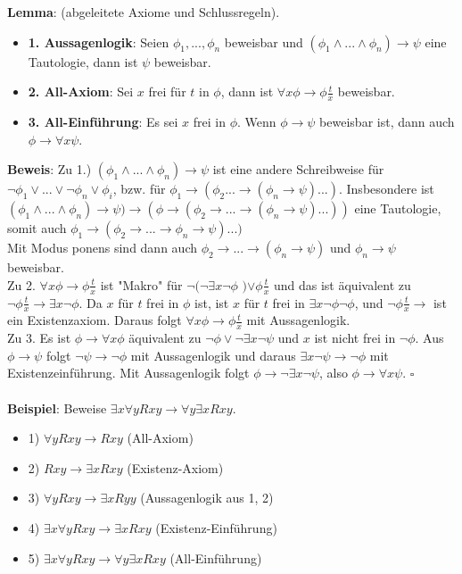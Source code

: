\documentclass[a4paper]{scrartcl}
\begin{document}
\textbf{Lemma}: (abgeleitete Axiome und Schlussregeln).
\begin{itemize}
\item \textbf{1. Aussagenlogik}: Seien $\phi_1, ..., \phi_n$ beweisbar und $(\phi_1 \wedge ... \wedge \phi_n) \rightarrow \psi$ eine Tautologie, dann ist $\psi$ beweisbar.
\item \textbf{2. All-Axiom}: Sei $x$ frei für $t$ in $\phi$, dann ist $\forall x \phi \rightarrow \phi \frac{t}{x}$ beweisbar.
\item \textbf{3. All-Einführung}: Es sei $x$ frei in $\phi$. Wenn $\phi \rightarrow \psi$ beweisbar ist, dann auch $\phi \rightarrow \forall x \psi$.
\end{itemize}
\textbf{Beweis}: Zu 1.) $(\phi_1 \wedge ... \wedge \phi_n) \rightarrow \psi$ ist eine andere Schreibweise für $\neg \phi_1 \vee ... \vee \neg \phi_n \vee \phi_i$, bzw. für $\phi_1 \rightarrow (\phi_2 ... \rightarrow (\phi_n \rightarrow \psi) ... )$. Insbesondere ist $(\phi_1 \wedge ... \wedge \phi_n) \rightarrow \psi) \rightarrow (\phi \rightarrow (\phi_2 \rightarrow ... \rightarrow (\phi_n \rightarrow \psi) ... ))$ eine Tautologie, somit auch $\phi_1 \rightarrow (\phi_2 \rightarrow ... \rightarrow \phi_n \rightarrow \psi) ... )$\\
Mit Modus ponens sind dann auch $\phi_2 \rightarrow ... \rightarrow (\phi_n \rightarrow \psi)$ und $\phi_n \rightarrow \psi$ beweisbar.\\
Zu 2. $\forall x \phi \rightarrow \phi \frac{t}{x}$ ist "Makro" für \sout{$\neg ( \neg$}$\exists x \neg \phi$ \sout{$)$}$\vee \phi \frac{t}{x}$ und das ist äquivalent zu $\neg \phi \frac{t}{x} \rightarrow \exists x \neg \phi$. Da $x$ für $t$ frei in $\phi$ ist, ist $x$ für $t$ frei in $\exists x \neg \phi \neg \phi$, und $\neg \phi \frac{t}{x} \rightarrow$ ist ein Existenzaxiom. Daraus folgt $\forall x \phi \rightarrow \phi \frac{t}{x}$ mit Aussagenlogik.\\
Zu 3. Es ist $\phi \rightarrow \forall x \phi$ äquivalent zu $\neg \phi \vee \neg \exists x \neg \psi$ und $x$ ist nicht frei in $\neg \phi$. Aus $\phi \rightarrow \psi$ folgt $\neg \psi \rightarrow \neg \phi$ mit Aussagenlogik und daraus $\exists x \neg \psi \rightarrow \neg \phi$ mit Existenzeinführung. Mit Aussagenlogik folgt $\phi \rightarrow \neg \exists x \neg \psi$, also $\phi \rightarrow \forall x \psi$. $\square$\\\\
\textbf{Beispiel}: Beweise $\exists x \forall y R x y \rightarrow \forall y \exists x R x y$.
\begin{itemize}
\item{1)} $\forall y R x y \rightarrow R x y$ (All-Axiom)
\item{2)} $R x y \rightarrow \exists x R x y$ (Existenz-Axiom)
\item{3)} $\forall y R x y \rightarrow \exists x R y y$ (Aussagenlogik aus 1, 2)
\item{4)} $\exists x \forall y R x y \rightarrow \exists x R x y$ (Existenz-Einführung)
\item{5)} $\exists x \forall y R x y \rightarrow \forall y \exists x R x y$ (All-Einführung)
\end{itemize}
\end{document}
